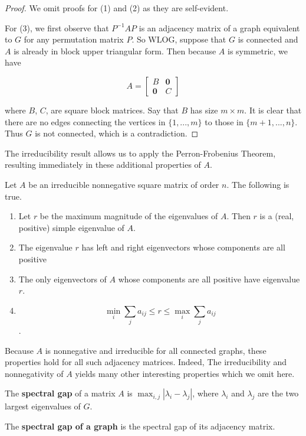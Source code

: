 \begin{proof}
  We omit proofs for (1) and (2) as they are self-evident.

  For (3), we first observe that $P^{-1}AP$ is an adjacency matrix of a graph
  equivalent to $G$ for any permutation matrix $P$. So WLOG, suppose that $G$ is
  connected and $A$ is already in block upper triangular form. Then because $A$
  is symmetric, we have

  \[
    A = \begin{bmatrix}
      B & \mathbf{0} \\
      \mathbf{0} & C
    \end{bmatrix}
  \]

  where $B$, $C$, are square block matrices. Say that $B$ has size $m \times m$. It is clear that
  there are no edges connecting the vertices in $\{1, ..., m\}$ to those in $\{m+1, ..., n\}$. Thus
  $G$ is not connected, which is a contradiction.
\end{proof}

The irreducibility result allows us to apply the Perron-Frobenius Theorem, resulting immediately in
these additional properties of $A$.

\begin{theorem}
  Let $A$ be an irreducible nonnegative square matrix of order $n$. The
  following is true.

  \begin{enumerate}
  \item Let $r$ be the maximum magnitude of the eigenvalues of $A$. Then $r$ is
    a (real, positive) simple eigenvalue of $A$.
  \item The eigenvalue $r$ has left and right eigenvectors whose components are
    all positive
  \item The only eigenvectors of $A$ whose components are all positive have
    eigenvalue $r$.
  \item
    \[ \min_i \sum_j a_{ij} \leq r \leq \max_i \sum_j a_{ij} \].
  \end{enumerate}
\end{theorem}

Because $A$ is nonnegative and irreducible for all connected graphs, these
properties hold for all such adjacency matrices. Indeed, The irreducibility and
nonnegativity of $A$ yields many other interesting properties which we omit
here.

\begin{definition}
  The \textbf{spectral gap} of a matrix $A$ is $\max_{i,j}|\lambda_i - \lambda_j|$, where
  $\lambda_i$ and $\lambda_j$ are the two largest eigenvalues of $G$.

  The \textbf{spectral gap of a graph} is the spectral gap of its adjacency matrix.
\end{definition}

